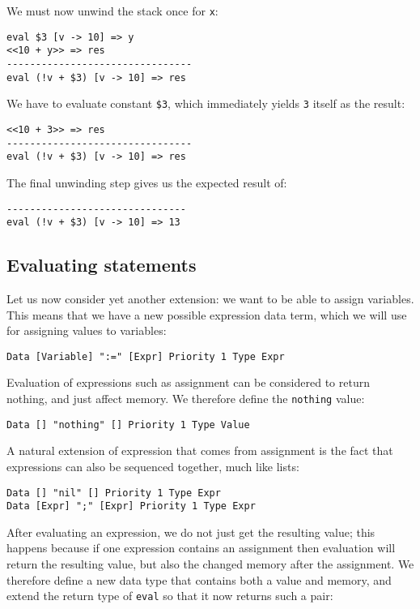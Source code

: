 We must now unwind the stack once for \texttt{x}:

\begin{lstlisting}
eval $3 [v -> 10] => y
<<10 + y>> => res
--------------------------------
eval (!v + $3) [v -> 10] => res
\end{lstlisting}

We have to evaluate constant \texttt{\$3}, which immediately yields \texttt{3} itself as the result:

\begin{lstlisting}
<<10 + 3>> => res
--------------------------------
eval (!v + $3) [v -> 10] => res
\end{lstlisting}

The final unwinding step gives us the expected result of:

\begin{lstlisting}
-------------------------------
eval (!v + $3) [v -> 10] => 13
\end{lstlisting}

\subsection{Evaluating statements}

Let us now consider yet another extension: we want to be able to assign variables. This means that we have a new possible expression data term, which we will use for assigning values to variables:

\begin{lstlisting}
Data [Variable] ":=" [Expr] Priority 1 Type Expr
\end{lstlisting}

Evaluation of expressions such as assignment can be considered to return nothing, and just affect memory. We therefore define the \texttt{nothing} value:

\begin{lstlisting}
Data [] "nothing" [] Priority 1 Type Value
\end{lstlisting}

A natural extension of expression that comes from assignment is the fact that expressions can also be sequenced together, much like lists:

\begin{lstlisting}
Data [] "nil" [] Priority 1 Type Expr
Data [Expr] ";" [Expr] Priority 1 Type Expr
\end{lstlisting}

After evaluating an expression, we do not just get the resulting value; this happens because if one expression contains an assignment then evaluation will return the resulting value, but also the changed memory after the assignment. We therefore define a new data type that contains both a value and memory, and extend the return type of \texttt{eval} so that it now returns such a pair:

